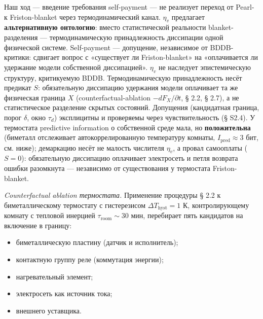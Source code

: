 \documentclass[pdflatex,sn-mathphys-ay]{sn-jnl}
\providecommand{\tightlist}{\setlength{\itemsep}{0pt}\setlength{\parskip}{0pt}}
\begin{document}
Наш ход --- введение требования self-payment --- не реализует переход от Pearl- к Friston-blanket через термодинамический канал. \(\eta_v\) предлагает \textbf{альтернативную онтологию}: вместо статистической реальности blanket-разделения --- термодинамическую принадлежность диссипации одной физической системе. Self-payment --- допущение, независимое от BDDB-критики: сдвигает вопрос с «существует ли Friston-blanket» на «оплачивается ли удержание модели собственной диссипацией». \(\eta_v\) не наследует эпистемическую структуру, критикуемую BDDB. Термодинамическую принадлежность несёт предикат \(S\): обязательную диссипацию удержания модели оплачивает та же физическая граница \(X\) (counterfactual-ablation \(-dF_X/\partial t\), § 2.2, § 2.7), а не статистическое разделение скрытых состояний. Допущения (кандидатная граница, порог \(\delta\), окно \(\tau_d\)) эксплицитны и проверяемы через чувствительность (§ S2.4). У термостата predictive information о собственной среде мала, но \textbf{положительна} (биметалл отслеживает автокоррелированную температуру комнаты, \(I_{\text{pred}} \approx 3\) бит, см. ниже); демаркацию несёт не малость числителя \(\eta_v\), а провал самооплаты (\(S = 0\)): обязательную диссипацию оплачивает электросеть и петля возврата ошибки разомкнута --- независимо от существования у термостата Friston-blanket.

\emph{Counterfactual ablation термостата.} Применение процедуры § 2.2 к биметаллическому термостату с гистерезисом \(\Delta T_{\text{hyst}} = 1\) К, контролирующему комнату с тепловой инерцией \(\tau_{\text{room}} \sim 30\) мин, перебирает пять кандидатов на включение в границу:

\begin{itemize}
\tightlist
\item
  биметаллическую пластину (датчик и исполнитель);
\item
  контактную группу реле (коммутация энергии);
\item
  нагревательный элемент;
\item
  электросеть как источник тока;
\item
  внешнего уставщика.
\end{itemize}
\end{document}
